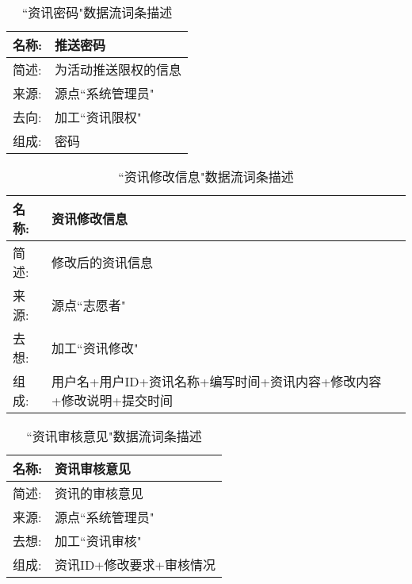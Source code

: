 \begin{table}[H]  
\caption{``资讯密码"数据流词条描述}  
\begin{center}  
    \begin{tabular}{l p{11cm}} 
        \hline
        \quad 名称:  &  推送密码 \\
        \hline
        \quad 简述:  & 为活动推送限权的信息 \\
        \hline
        \quad 来源:  & 源点``系统管理员" \\
        \hline
        \quad 去向:  & 加工``资讯限权" \\
        \hline
        \quad 组成:  & 密码 \\
        \hline
    \end{tabular}
    \label{tab1}
\end{center}
\end{table}


\begin{table}[H]  
\caption{``资讯修改信息"数据流词条描述}  
\begin{center}  
    \begin{tabular}{l p{11cm}} 
        \hline
        \quad 名称:  &  资讯修改信息 \\
        \hline
        \quad 简述:  & 修改后的资讯信息 \\
        \hline
        \quad 来源:  & 源点``志愿者" \\
        \hline
        \quad 去想:  & 加工``资讯修改" \\
        \hline
        \quad 组成:  & 用户名+用户ID+资讯名称+编写时间+资讯内容+修改内容+修改说明+提交时间 \\
        \hline
    \end{tabular}
    \label{tab1}
\end{center}
\end{table}

\begin{table}[H]  
\caption{``资讯审核意见"数据流词条描述}  
\begin{center}  
    \begin{tabular}{l p{11cm}} 
        \hline
        \quad 名称:  &  资讯审核意见 \\
        \hline
        \quad 简述:  & 资讯的审核意见 \\
        \hline
        \quad 来源:  & 源点``系统管理员" \\
        \hline
        \quad 去想:  & 加工``资讯审核" \\
        \hline
        \quad 组成:  & 资讯ID+修改要求+审核情况 \\
        \hline
    \end{tabular}
    \label{tab1}
\end{center}
\end{table}

